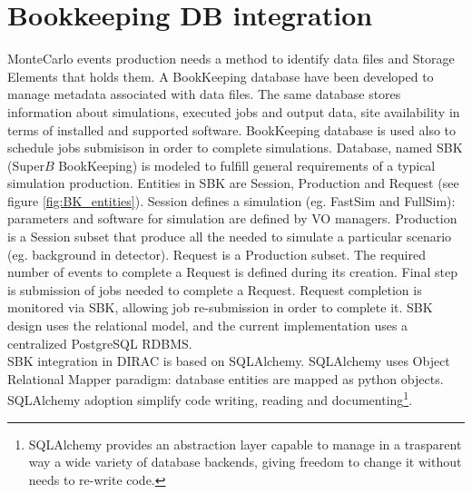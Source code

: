 \documentclass[a4paper]{jpconf}
\begin{document}
\section{Bookkeeping DB integration}
\label{sec:db}
MonteCarlo events production needs a method to identify data files and Storage Elements
that holds them. A BookKeeping database have been developed to manage metadata associated with
data files. The same database stores information about simulations, executed jobs and output data, site availability
in terms of installed and supported software.
BookKeeping database is used also to schedule jobs submisison in order to complete simulations.
Database, named SBK (Super$B$ BookKeeping) is modeled to fulfill general requirements of a typical simulation production.
Entities in SBK are Session, Production and Request (see figure \ref{fig:BK_entities}). Session defines a simulation (eg. FastSim and FullSim): parameters and software for simulation are defined by VO managers. Production is a Session subset that produce all the  needed to simulate a particular scenario (eg. background in detector).
Request is a Production subset. The required number of events to complete a Request is defined during its creation.
Final step is submission of jobs needed to complete a Request. Request completion is monitored via SBK, allowing job re-submission in order to complete it. SBK design uses the relational model, and the current implementation uses a centralized PostgreSQL RDBMS.\\
SBK integration in DIRAC is based on SQLAlchemy. SQLAlchemy uses Object Relational Mapper paradigm: database entities are mapped as python objects. SQLAlchemy adoption simplify code writing, reading and documenting\footnote{SQLAlchemy provides an abstraction layer capable to manage in a trasparent way a wide variety of database backends, giving freedom to change it without needs to re-write code.}. 
\end{document}
